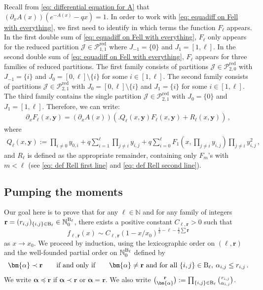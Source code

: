 \documentclass{article}
\theoremstyle{remark}
\newcommand{\bN}{\mathbb{N}}
\newcommand{\pairs}{{\rm B}}
\newcommand{\cJ}{\mathcal{J}}
\newcommand{\cP}{\mathcal{P}}
\newcommand{\by}{{\mathbf{y}}}
\newcommand{\br}{{\mathbf{r}}}
\newcommand{\red}{\mathrm{red}}
\begin{document}
Recall from \eqref{eq: differential equation for A} that $\left(\partial_x A(x) \right) \left( e^{-A(x)} - qx \right) = 1$.
In order to work with \eqref{eq: equadiff on Fell with everything}, we first need to identify in which terms the function $F_\ell$ appears.
In the first double sum of \eqref{eq: equadiff on Fell with everything}, $F_\ell$ only appears for the reduced partition $\cJ\in\cP_{1,1}^\red$ where $J_{-1}=\{0\}$ and $J_1=[1,\ell]$.
In the second double sum of \eqref{eq: equadiff on Fell with everything}, $F_\ell$ appears for three families of reduced partitions.
The first family consists of partitions $\cJ\in\cP_{2,0}^\red$ with $J_{-1}=\{i\}$ and $J_0=[0,\ell]\setminus\{i\}$ for some $i\in[1,\ell]$.
The second family consists of partitions $\cJ\in\cP_{2,1}^\red$ with $J_0=[0,\ell]\setminus\{i\}$ and $J_{1}=\{i\}$ for some $i\in[1,\ell]$.
The third family contains the single partition $\cJ\in\cP_{2,1}^\red$ with $J_0=\{0\}$ and $J_{1}=[1,\ell]$.
Therefore, we can write:
\begin{align}\label{eq: equadiff on Fell with Q and R}
    \partial_x F_\ell(x,\by) = \left(\partial_x A(x) \right)
    \left(\big. Q_\ell(x,\by) F_\ell(x,\by) + R_\ell(x,\by) \right) \,,
\end{align}
where
\begin{align}\label{eq: def Q}
    Q_\ell(x,\by) := \prod_{i\ne0} y_{0,i}
    + q \sum_{i=1}^\ell \prod_{j\ne i} y_{i,j}
    + q \sum_{i=0}^\ell F_1{\left(x, \prod_{j\ne i} y_{i,j} \right)} \prod_{j\ne i} y_{i,j}^2 \,,
\end{align}
and $R_\ell$ is defined as the appropriate remainder, containing only $F_m$'s with $m<\ell$ (see \eqref{eq: def Rell first line} and \eqref{eq: def Rell second line}).


\subsection{Pumping the moments}
\label{sec: Pumping the moments}

Our goal here is to prove that for any $\ell\in\bN$ and for any family of integers $\br = (r_{i,j})_{\{i,j\}\in \pairs_\ell} \in \bN_0^{\pairs_\ell}$, there exists a positive constant $C_{\ell,\br} > 0$ such that
\begin{equation}\label{eq: claim singularity fellr}
    f_{\ell,\br}(x) \sim C_{\ell,\br} (1-x/x_0)^{\frac12 - \ell - \frac12 \sum \br}
\end{equation}
as $x\to x_0$.
We proceed by induction, using the lexicographic order on $(\ell,\br)$ and the well-founded partial order on $\bN_0^{\pairs_\ell}$ defined by
\begin{equation*}
    \bm{\alpha} \prec \br
    \qquad\text{if and only if}\qquad
    \bm{\alpha}\ne\br 
    \text{ and for all }\{i,j\}\in \pairs_\ell,\:
    \alpha_{i,j} \le r_{i,j} \,.
\end{equation*}
We write $\bm{\alpha} \preceq \br$ if $\bm{\alpha} \prec \br$ or $\bm{\alpha} = \br$.
We also write $\binom{\br}{\bm{\alpha}} := \prod_{\{i,j\}\in \pairs_\ell} \binom{r_{i,j}}{\alpha_{i,j}}$.
\end{document}
